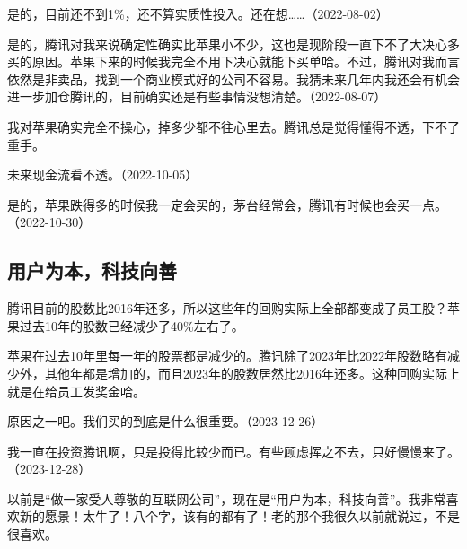 
是的，目前还不到1\%，还不算实质性投入。还在想……（2022-08-02）


是的，腾讯对我来说确定性确实比苹果小不少，这也是现阶段一直下不了大决心多买的原因。苹果下来的时候我完全不用下决心就能下买单哈。不过，腾讯对我而言依然是非卖品，找到一个商业模式好的公司不容易。我猜未来几年内我还会有机会进一步加仓腾讯的，目前确实还是有些事情没想清楚。（2022-08-07）

我对苹果确实完全不操心，掉多少都不往心里去。腾讯总是觉得懂得不透，下不了重手。


未来现金流看不透。（2022-10-05）


是的，苹果跌得多的时候我一定会买的，茅台经常会，腾讯有时候也会买一点。（2022-10-30）

\subsection{用户为本，科技向善}

腾讯目前的股数比2016年还多，所以这些年的回购实际上全部都变成了员工股？苹果过去10年的股数已经减少了40\%左右了。

苹果在过去10年里每一年的股票都是减少的。腾讯除了2023年比2022年股数略有减少外，其他年都是增加的，而且2023年的股数居然比2016年还多。这种回购实际上就是在给员工发奖金哈。


原因之一吧。我们买的到底是什么很重要。（2023-12-26）

我一直在投资腾讯啊，只是投得比较少而已。有些顾虑挥之不去，只好慢慢来了。（2023-12-28）


以前是“做一家受人尊敬的互联网公司”，现在是“用户为本，科技向善”。我非常喜欢新的愿景！太牛了！八个字，该有的都有了！老的那个我很久以前就说过，不是很喜欢。


